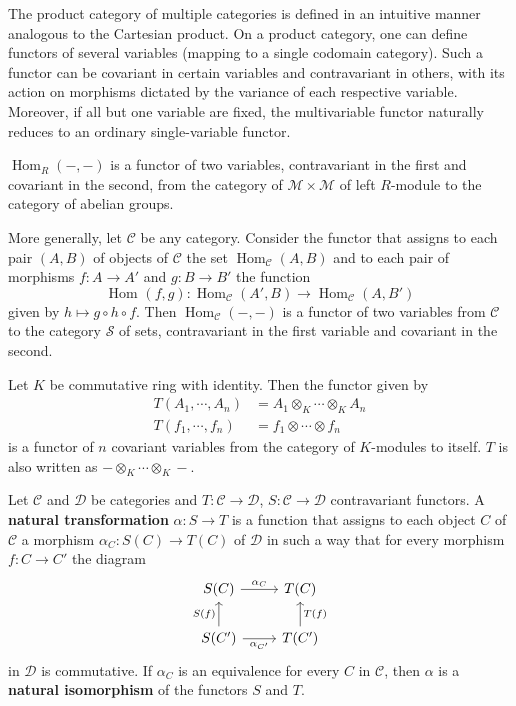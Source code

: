 \documentclass{article}
\DeclareMathOperator{\Hom}{Hom}
\begin{document}
The product category of multiple categories is defined in an intuitive manner analogous to the Cartesian product. On a product category, one can define functors of several variables (mapping to a single codomain category). Such a functor can be covariant in certain variables and contravariant in others, with its action on morphisms dictated by the variance of each respective variable. Moreover, if all but one variable are fixed, the multivariable functor naturally reduces to an ordinary single-variable functor.

\begin{example}
    $\Hom_{R}(-, -)$ is a functor of two variables, contravariant in the first and covariant in the second, from the category of $\mathscr{M} \times \mathscr{M}$ of left $R$-module to the category of abelian groups.

    More generally, let $\mathscr{C}$ be any category. Consider the functor that assigns to each pair $(A,B)$ of objects of $\mathscr{C}$ the set $\Hom_{\mathscr{C}}(A, B)$ and to each pair of morphisms $f:A\to A'$ and $g:B\to B'$ the function 
    \begin{equation*}
        \Hom_{}(f, g): \Hom_{\mathscr{C}}(A', B) \to \Hom_{\mathscr{C}}(A, B')
    \end{equation*}
    given by $h \mapsto g \circ h \circ f$. Then $\Hom_{\mathscr{C}}(-, -)$ is a functor of two variables from $\mathscr{C}$ to the category $\mathscr{S}$ of sets, contravariant in the first variable and covariant in the second.
\end{example}

\begin{example}
    Let $K$ be commutative ring with identity. Then the functor given by
    \begin{align*}
        T(A_1, \cdots, A_n) &= A_1 \otimes_K \cdots \otimes_K A_n \\
        T(f_1, \cdots, f_n) &= f_1 \otimes \cdots \otimes f_n
    \end{align*}
    is a functor of $n$ covariant variables from the category of $K$-modules to itself. $T$ is also written as $- \otimes_K \cdots \otimes_K -$.
\end{example}

\begin{definition}
    Let $\mathscr{C}$ and $\mathscr{D}$ be categories and $T:\mathscr{C}\to \mathscr{D}$, $S:\mathscr{C}\to \mathscr{D}$ contravariant functors. A \textbf{natural transformation} $\alpha:S\to T$ is a function that assigns to each object $C$ of $\mathscr{C}$ a morphism $\alpha_C:S(C)\to T(C)$ of $\mathscr{D}$ in such a way that for every morphism $f:C\to C'$ the diagram
    $$    \begin{tikzcd}
        S(C) \arrow[r, "\alpha_C"]                        & T(C)                     \\
        S(C') \arrow[r, "\alpha_{C'}"'] \arrow[u, "S(f)"] & T(C') \arrow[u, "T(f)"']
    \end{tikzcd}$$
    in $\mathscr{D}$ is commutative. If $\alpha_C$ is an equivalence for every $C$ in $\mathscr{C}$, then $\alpha$ is a \textbf{natural isomorphism} of the functors $S$ and $T$.    
\end{definition}
\end{document}

